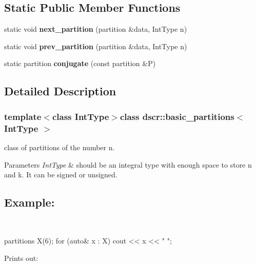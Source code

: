 \subsection*{Static Public Member Functions}
\begin{DoxyCompactItemize}
\item 
\hypertarget{classdscr_1_1basic__partitions_a44f2fa1a88b532ccb353fb690604e06a}{static void {\bfseries next\-\_\-partition} (partition \&data, Int\-Type n)}\label{classdscr_1_1basic__partitions_a44f2fa1a88b532ccb353fb690604e06a}

\item 
\hypertarget{classdscr_1_1basic__partitions_aac2c8cd7f779665d3b33000cb223135e}{static void {\bfseries prev\-\_\-partition} (partition \&data, Int\-Type n)}\label{classdscr_1_1basic__partitions_aac2c8cd7f779665d3b33000cb223135e}

\item 
\hypertarget{classdscr_1_1basic__partitions_a6d167454ab3580a5acfee00c024232d3}{static partition {\bfseries conjugate} (const partition \&P)}\label{classdscr_1_1basic__partitions_a6d167454ab3580a5acfee00c024232d3}

\end{DoxyCompactItemize}


\subsection{Detailed Description}
\subsubsection*{template$<$class Int\-Type$>$class dscr\-::basic\-\_\-partitions$<$ Int\-Type $>$}

class of partitions of the number n. 


\begin{DoxyParams}{Parameters}
{\em Int\-Type} & should be an integral type with enough space to store n and k. It can be signed or unsigned. \subsection*{Example\-:}\\
\hline
\end{DoxyParams}
\begin{DoxyVerb}partitions X(6);
for (auto& x : X)
    cout << x << " ";
\end{DoxyVerb}


Prints out\-: \begin{DoxyVerb}[ 1 1 1 1 1 1 ] [ 2 1 1 1 1 ] [ 3 1 1 1 ] [ 2 2 1 1 ] [ 4 1 1 ] [ 3 2 1 ] [ 2 2 2 ] [ 5 1 ] [ 4 2 ] [ 3 3 ] [ 6 ] \end{DoxyVerb}
 

